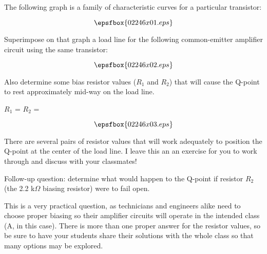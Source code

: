 

The following graph is a family of characteristic curves for a particular transistor:

$$\epsfbox{02246x01.eps}$$

Superimpose on that graph a load line for the following common-emitter amplifier circuit using the same transistor:

$$\epsfbox{02246x02.eps}$$

Also determine some bias resistor values ($R_1$ and $R_2$) that will cause the Q-point to rest approximately mid-way on the load line.

\vskip 10pt

$R_1$ = \hskip 80pt $R_2$ =







$$\epsfbox{02246x03.eps}$$

There are several pairs of resistor values that will work adequately to position the Q-point at the center of the load line.  I leave this an an exercise for you to work through and discuss with your classmates!

\vskip 10pt

Follow-up question: determine what would happen to the Q-point if resistor $R_2$ (the 2.2 k$\Omega$ biasing resistor) were to fail open.







This is a very practical question, as technicians and engineers alike need to choose proper biasing so their amplifier circuits will operate in the intended class (A, in this case).  There is more than one proper answer for the resistor values, so be sure to have your students share their solutions with the whole class so that many options may be explored.




